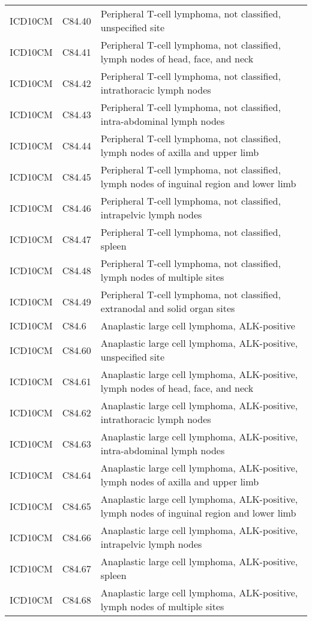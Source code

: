 \begin{table}[ht]
\begin{tabular}{lll}
  ICD10CM & C84.40 & Peripheral T-cell lymphoma, not classified, unspecified site \\ 
  ICD10CM & C84.41 & Peripheral T-cell lymphoma, not classified, lymph nodes of head, face, and neck \\ 
  ICD10CM & C84.42 & Peripheral T-cell lymphoma, not classified, intrathoracic lymph nodes \\ 
  ICD10CM & C84.43 & Peripheral T-cell lymphoma, not classified, intra-abdominal lymph nodes \\ 
  ICD10CM & C84.44 & Peripheral T-cell lymphoma, not classified, lymph nodes of axilla and upper limb \\ 
  ICD10CM & C84.45 & Peripheral T-cell lymphoma, not classified, lymph nodes of inguinal region and lower limb \\ 
  ICD10CM & C84.46 & Peripheral T-cell lymphoma, not classified, intrapelvic lymph nodes \\ 
  ICD10CM & C84.47 & Peripheral T-cell lymphoma, not classified, spleen \\ 
  ICD10CM & C84.48 & Peripheral T-cell lymphoma, not classified, lymph nodes of multiple sites \\ 
  ICD10CM & C84.49 & Peripheral T-cell lymphoma, not classified, extranodal and solid organ sites \\ 
  ICD10CM & C84.6 & Anaplastic large cell lymphoma, ALK-positive \\ 
  ICD10CM & C84.60 & Anaplastic large cell lymphoma, ALK-positive, unspecified site \\ 
  ICD10CM & C84.61 & Anaplastic large cell lymphoma, ALK-positive, lymph nodes of head, face, and neck \\ 
  ICD10CM & C84.62 & Anaplastic large cell lymphoma, ALK-positive, intrathoracic lymph nodes \\ 
  ICD10CM & C84.63 & Anaplastic large cell lymphoma, ALK-positive, intra-abdominal lymph nodes \\ 
  ICD10CM & C84.64 & Anaplastic large cell lymphoma, ALK-positive, lymph nodes of axilla and upper limb \\ 
  ICD10CM & C84.65 & Anaplastic large cell lymphoma, ALK-positive, lymph nodes of inguinal region and lower limb \\ 
  ICD10CM & C84.66 & Anaplastic large cell lymphoma, ALK-positive, intrapelvic lymph nodes \\ 
  ICD10CM & C84.67 & Anaplastic large cell lymphoma, ALK-positive, spleen \\ 
  ICD10CM & C84.68 & Anaplastic large cell lymphoma, ALK-positive, lymph nodes of multiple sites \\ 

\end{tabular}
\end{table}
